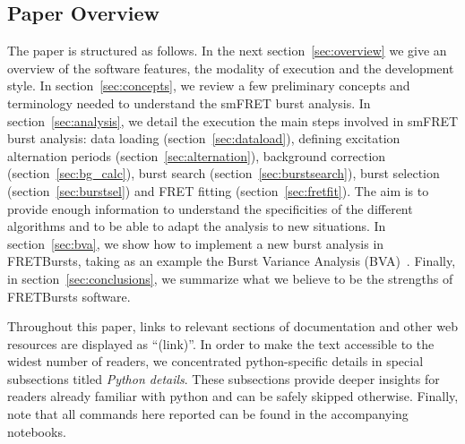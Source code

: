 \subsection{Paper Overview}

The paper is structured as follows.
In the next section~\ref{sec:overview} we give an overview of the software features,
the modality of execution and the development style.
In section~\ref{sec:concepts}, we
review a few preliminary concepts and terminology needed
to understand the smFRET burst analysis.
In section~\ref{sec:analysis}, we detail the execution the main steps involved
in smFRET burst analysis: data loading (section~\ref{sec:dataload}), defining
excitation alternation periods (section~\ref{sec:alternation}), background
correction (section~\ref{sec:bg_calc}), burst search (section~\ref{sec:burstsearch}),
burst selection (section~\ref{sec:burstsel}) and FRET fitting (section~\ref{sec:fretfit}).
The aim is to provide enough information to understand the specificities of
the different algorithms and to be able to adapt the analysis to new situations.
In section~\ref{sec:bva}, we show how to implement a new burst analysis in FRETBursts,
taking as an example the Burst Variance Analysis (BVA)~\cite{Torella_2011}.
Finally, in section~\ref{sec:conclusions}, we summarize what we believe to be
the strengths of FRETBursts software.

Throughout this paper,
links to relevant sections of documentation and other web resources
are displayed as ``(link)''.
In order to make the text accessible to the widest number of readers,
we concentrated python-specific details in special subsections titled
\textit{Python details}. These subsections provide deeper insights for readers
already familiar with python and can be safely skipped otherwise. 
Finally, note that all commands here reported can be found in the 
accompanying notebooks.


